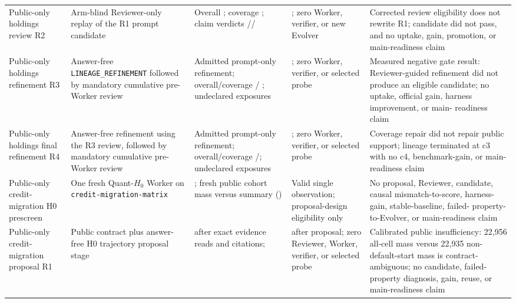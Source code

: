 \begin{table}[t]
\begin{tabular}{p{}p{}p{}p{}p{}}
Public-only holdings review R2 & Arm-blind Reviewer-only replay of the R1
prompt candidate & Overall \HoldingsReviewOverall{}; coverage
\HoldingsReviewCoverage{}; claim verdicts
\HoldingsReviewCanonicalization{}/\HoldingsReviewNumericCoercion{}/
\HoldingsReviewReconciliation{} & \HoldingsReviewDecision{}; zero Worker,
verifier, or new Evolver & Corrected review eligibility does not rewrite R1;
candidate did not pass, and no uptake, gain, promotion, or main-readiness claim
\\

Public-only holdings refinement R3 & Answer-free
\texttt{LINEAGE\_REFINEMENT} followed by mandatory cumulative pre-Worker
review & Admitted \HoldingsRefineProposalDecision{} prompt-only refinement;
overall/coverage \HoldingsRefineReviewOverall{}/
\HoldingsRefineReviewCoverage{}; \HoldingsRefineReviewUndeclared{} undeclared
exposures & \HoldingsRefineDecision{}; zero Worker, verifier, or selected probe
& Measured negative gate result: Reviewer-guided refinement did not produce an
eligible candidate; no uptake, official gain, harness improvement, or main-
readiness claim \\

Public-only holdings final refinement R4 & Answer-free refinement using the R3
review, followed by mandatory cumulative pre-Worker review & Admitted
\HoldingsRefineRfourProposalDecision{} prompt-only refinement; overall/coverage
\HoldingsRefineRfourReviewOverall{}/\HoldingsRefineRfourReviewCoverage{};
\HoldingsRefineRfourReviewUndeclared{} undeclared exposures &
\HoldingsRefineRfourDecision{}; zero Worker, verifier, or selected probe &
Coverage repair did not repair public support; lineage terminated at c3 with
no c4, benchmark-gain, or main-readiness claim \\

Public-only credit-migration H0 prescreen & One fresh Quant-$H_0$ Worker on
\texttt{credit-migration-matrix} & \CreditMigrationHZeroOfficial{}; fresh
public cohort mass \CreditMigrationHZeroCohortMass{} versus summary
\CreditMigrationHZeroSummaryMass{} (\CreditMigrationHZeroMassGap{}) & Valid
single observation; proposal-design eligibility only & No proposal, Reviewer,
candidate, causal mismatch-to-score, harness-gain, stable-baseline, failed-
property-to-Evolver, or main-readiness claim \\

Public-only credit-migration proposal R1 & Public contract plus answer-free H0
trajectory proposal stage & \CreditMigrationProposalDecision{} after
\CreditMigrationProposalReads{} exact evidence reads and
\CreditMigrationProposalCitations{} citations; \CreditMigrationProposalMutation{}
& \CreditMigrationProposalStatus{} after proposal; zero Reviewer, Worker,
verifier, or selected probe & Calibrated public insufficiency: 22,956 all-cell
mass versus 22,935 non-default-start mass is contract-ambiguous; no candidate,
failed-property diagnosis, gain, reuse, or main-readiness claim \\


\end{tabular}
\end{table}
